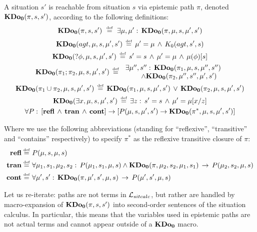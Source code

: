\begin{defnL}
 A situation $s'$ is reachable
from situation $s$ via epistemic path $\pi$, denoted $\mathbf{KDo_{0}}(\pi,s,s')$,
according to the following definitions:\label{def:KDoZ}\[
\mathbf{KDo_{0}}(\pi,s,s')\,\,\stackrel{\mbox{\tiny def}}{=}\,\,\exists\mu,\mu':\,\mathbf{KDo_{0}}(\pi,\mu,s,\mu',s')\]
 \begin{gather*}
\mathbf{KDo_{0}}(agt,\mu,s,\mu',s')\,\stackrel{\mbox{\tiny def}}{=}\,\mu'=\mu\,\wedge\, K_{0}(agt,s',s)\\
\mathbf{KDo_{0}}(?\phi,\mu,s,\mu',s')\,\stackrel{\mbox{\tiny def}}{=}\, s'=s\,\wedge\,\mu'=\mu\,\wedge\,\mu(\phi)[s]\\
\mathbf{KDo_{0}}(\pi_{1};\pi_{2},\mu,s,\mu',s')\,\stackrel{\mbox{\tiny def}}{=}\,\begin{array}{c}
\exists\mu'',s'':\,\mathbf{KDo_{0}}(\pi_{1},\mu,s,\mu'',s'')\\
\,\,\,\,\,\,\,\,\,\,\wedge\mathbf{KDo_{0}}(\pi_{2},\mu'',s'',\mu',s')\end{array}\\
\mathbf{KDo_{0}}(\pi_{1}\cup\pi_{2},\mu,s,\mu',s')\,\stackrel{\mbox{\tiny def}}{=}\,\mathbf{KDo_{0}}(\pi_{1},\mu,s,\mu',s')\,\vee\,\mathbf{KDo_{0}}(\pi_{2},\mu,s,\mu',s')\\
\mathbf{KDo_{0}}(\exists x,\mu,s,\mu',s')\,\stackrel{\mbox{\tiny def}}{=}\,\exists z:\, s'=s\,\wedge\,\mu'=\mu[x/z]\\
\forall P:\,\left[\mathbf{refl}\,\wedge\,\mathbf{tran}\,\wedge\,\mathbf{cont}\right]\rightarrow\left[P(\mu,s,\mu',s')\rightarrow\mathbf{KDo_{0}}(\pi^{*},\mu,s,\mu',s')\right]\end{gather*}

\end{defnL}
Where we use the following abbreviations (standing for {}``reflexive'',
{}``transitive'' and {}``contains'' respectively) to specify $\pi^{*}$
as the reflexive transitive closure of $\pi$:\begin{align*}
\mathbf{refl}\stackrel{\mbox{\tiny def}}{=} & \,\, P(\mu,s,\mu,s)\\
\mathbf{tran\stackrel{\mbox{\tiny def}}{=}} & \,\,\forall\mu_{1},s_{1},\mu_{2},s_{2}:\, P(\mu_{1},s_{1},\mu,s)\wedge\mathbf{KDo_{0}}(\pi,\mu_{2},s_{2},\mu_{1},s_{1})\,\rightarrow\, P(\mu_{2},s_{2},\mu,s)\\
\mathbf{cont}\stackrel{\mbox{\tiny def}}{=} & \,\,\forall\mu',s':\,\mathbf{KDo_{0}}(\pi,\mu',s',\mu,s)\,\rightarrow\, P(\mu',s',\mu,s)\end{align*}


Let us re-iterate: paths are not terms in $\mathcal{L}_{sitcalc}$, but rather are
handled by macro-expansion of $\mathbf{KDo_{0}}(\pi,s,s')$ into second-order
sentences of the situation calculus. In particular, this means that
the variables used in epistemic paths are not actual terms and cannot
appear outside of a $\mathbf{KDo_{0}}$ macro.

